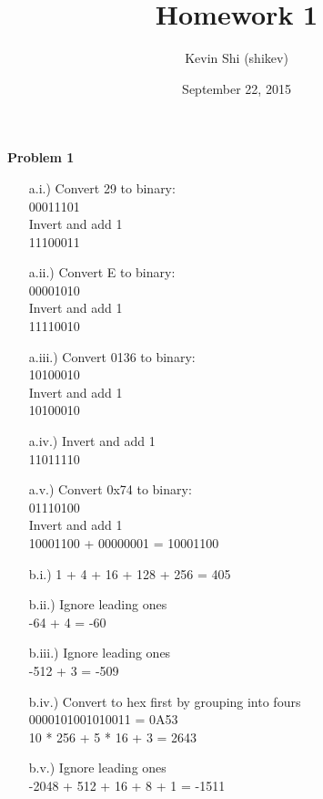 \documentclass[a4paper,10pt]{article}
\title{Homework 1}
\author{Kevin Shi (shikev)}
\date{September 22, 2015}
\begin{document}
\maketitle
\noindent\textbf{Problem 1}\\
\begin{itemize}
 \item[a.i.)]
 Convert 29 to binary:\\
 00011101\\
 Invert and add 1\\
 11100011\\
 
 \item[a.ii.)]
 Convert E to binary:\\
 00001010\\
 Invert and add 1\\
 11110010\\
 
 \item[a.iii.)]
 Convert 0136 to binary:\\
 10100010\\
 Invert and add 1\\
 10100010\\
 
 \item[a.iv.)]
 Invert and add 1\\
 11011110\\
 
 \item[a.v.)]
 Convert 0x74 to binary:\\
 01110100\\
 Invert and add 1\\
 10001100 + 00000001 = 10001100\\
 
 
 \item[b.i.)]
 1 + 4 + 16 + 128 + 256 = 405\\
 
 \item[b.ii.)]
 Ignore leading ones\\
 -64 + 4 = -60\\
 
 \item[b.iii.)]
 Ignore leading ones\\
 -512 + 3 = -509\\
 
 \item[b.iv.)]
 Convert to hex first by grouping into fours\\
 0000101001010011 = 0A53\\
 10 * 256 + 5 * 16 + 3 = 2643\\
 
 \item[b.v.)]
 Ignore leading ones\\
 -2048 + 512 + 16 + 8 + 1 = -1511\\

\end{itemize}
\end{document}
